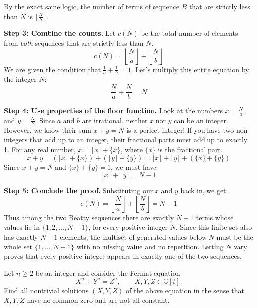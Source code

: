 \begin{solution}
By the exact same logic, the number of terms of sequence $B$ that are strictly less than $N$ is $\lfloor \frac{N}{b} \rfloor$.

\textbf{Step 3: Combine the counts.}
Let $c(N)$ be the total number of elements from \textit{both} sequences that are strictly less than $N$.
\[ c(N) = \left\lfloor \frac{N}{a} \right\rfloor + \left\lfloor \frac{N}{b} \right\rfloor \]
We are given the condition that $\frac{1}{a} + \frac{1}{b} = 1$. Let's multiply this entire equation by the integer $N$:
\[ \frac{N}{a} + \frac{N}{b} = N \]

\textbf{Step 4: Use properties of the floor function.}
Look at the numbers $x = \frac{N}{a}$ and $y = \frac{N}{b}$.
Since $a$ and $b$ are irrational, neither $x$ nor $y$ can be an integer.
However, we know their sum $x + y = N$ is a perfect integer!
If you have two non-integers that add up to an integer, their fractional parts must add up to exactly 1.
For any real number, $x = \lfloor x \rfloor + \{x\}$, where $\{x\}$ is the fractional part.
\[ x + y = (\lfloor x \rfloor + \{x\}) + (\lfloor y \rfloor + \{y\}) = \lfloor x \rfloor + \lfloor y \rfloor + (\{x\} + \{y\}) \]
Since $x+y = N$ and $\{x\} + \{y\} = 1$, we must have:
\[ \lfloor x \rfloor + \lfloor y \rfloor = N - 1 \]

\textbf{Step 5: Conclude the proof.}
Substituting our $x$ and $y$ back in, we get:
\[ c(N) = \left\lfloor \frac{N}{a} \right\rfloor + \left\lfloor \frac{N}{b} \right\rfloor = N - 1 \]
Thus among the two Beatty sequences there are exactly $N-1$ terms whose values lie in
$\{1,2,\ldots,N-1\}$, for every positive integer $N$.
Since this finite set also has exactly $N-1$ elements, the multiset of generated
values below $N$ must be the whole set $\{1,\ldots,N-1\}$ with no missing value
and no repetition.  Letting $N$ vary proves that every positive integer appears
in exactly one of the two sequences.
\end{solution}

\begin{exercise}
\label{algebra:2010:8}
Let $n \geq 2$ be an integer and consider the Fermat equation
\[ X^n + Y^n = Z^n, \qquad X, Y, Z \in \mathbb{C}[t]. \]
Find all nontrivial solutions $(X, Y, Z)$ of the above equation in the sense that $X, Y, Z$ have no common zero and are not all constant.
\end{exercise}


